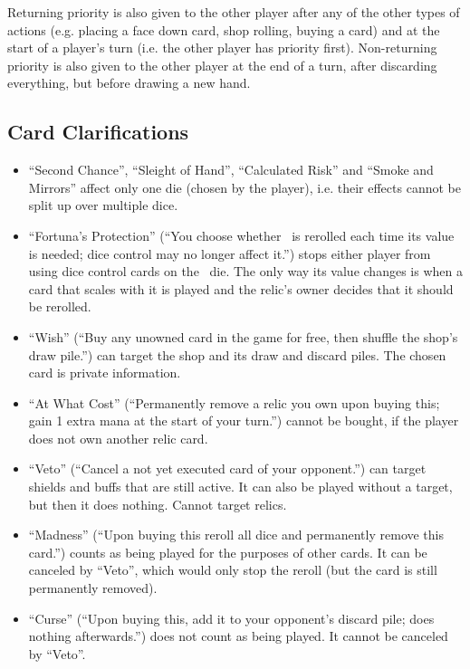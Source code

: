 \documentclass[dvipsnames,parskip,a4paper]{scrartcl}
\newcommand{\iconsize}{3.4mm}
\newcommand{\icondepth}{0.45mm}
\newcommand{\icon}[1]{\raisebox{-\icondepth}{\texttt{[image:  \#1 ]}}}
\newcommand{\chance}{\icon{icons/chance.png}}
\begin{document}
\vspace{4pt}

Returning priority is also given to the other player after any of the other types of actions (e.g. placing a face down card, shop rolling, buying a card) and at the start of a player's turn (i.e. the other player has priority first). Non-returning priority is also given to the other player at the end of a turn, after discarding everything, but before drawing a new hand.

\newpage

\subsection*{Card Clarifications}

\begin{itemize}
\item ``Second Chance'', ``Sleight of Hand'', ``Calculated Risk'' and ``Smoke and Mirrors'' affect only one die (chosen by the player), i.e. their effects cannot be split up over multiple dice.
\item ``Fortuna's Protection'' (``You choose whether \chance \ is rerolled each time its value is needed; dice control may no longer affect it.'') stops either player from using dice control cards on the \chance \ die. The only way its value changes is when a card that scales with it is played and the relic's owner decides that it should be rerolled.
\item ``Wish'' (``Buy any unowned card in the game for free, then shuffle the shop's draw pile.'') can target the shop and its draw and discard piles. The chosen card is private information.
\item ``At What Cost'' (``Permanently remove a relic you own upon buying this; gain 1 extra mana at the start of your turn.'') cannot be bought, if the player does not own another relic card.
\item ``Veto'' (``Cancel a not yet executed card of your opponent.'')  can target shields and buffs that are still active. It can also be played without a target, but then it does nothing. Cannot target relics.
\item ``Madness'' (``Upon buying this reroll all dice and permanently remove this card.'') counts as being played for the purposes of other cards. It can be canceled by ``Veto'', which would only stop the reroll (but the card is still permanently removed). 
\item ``Curse'' (``Upon buying this, add it to your opponent's discard pile; does nothing afterwards.'') does not count as being played. It cannot be canceled by ``Veto''.
\end{itemize}
\end{document}
